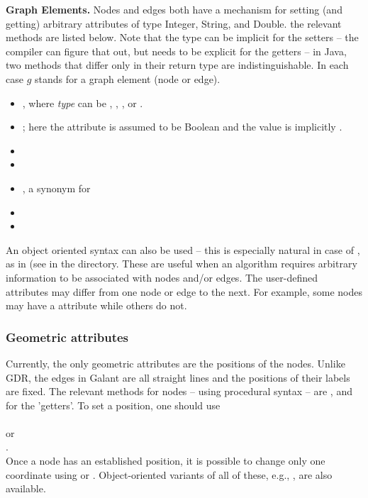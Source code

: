 \bigskip
\textbf{Graph Elements.}
Nodes and edges both have a mechanism for setting (and getting)
arbitrary attributes of type Integer, String, and Double.
the relevant methods are listed below.
Note that the type can be implicit for the setters -- the compiler can figure
that out, but needs to be explicit for the getters -- in Java, two methods
that differ only in their return type are indistinguishable.
In each case $g$ stands for a graph element (node or edge).
\begin{itemize}
  \item {},
    where \emph{type} can be , , ,
    or .
  \item {}; here the attribute is assumed to
    be Boolean and the value is implicitly .
  \item {}
  \item {}
    \item {}, a synonym for
  \item {}
  \item {}
\end{itemize}
An object oriented syntax can also be used -- this is especially natural in
case of , as in  (see  in the
 directory.
These are useful when an algorithm requires arbitrary information to be
associated with nodes and/or edges.
The user-defined attributes may differ from one node or edge to the next.
For example, some nodes may have a  attribute while others do not.

\subsubsection{Geometric attributes}

Currently, the only geometric attributes are the positions of the
nodes. 
Unlike GDR, the edges in Galant
are all straight lines and the positions of their labels are fixed.
The relevant methods for nodes -- using procedural syntax -- are
, 
and 
for the 'getters'. To set a position,
one should use\\
\hspace*{2em}\\
or\\
\hspace*{2em}.\\
Once a node has an established position, it is possible to change
only one coordinate using  or .
Object-oriented variants of all of these, e.g.,
, are also available.

